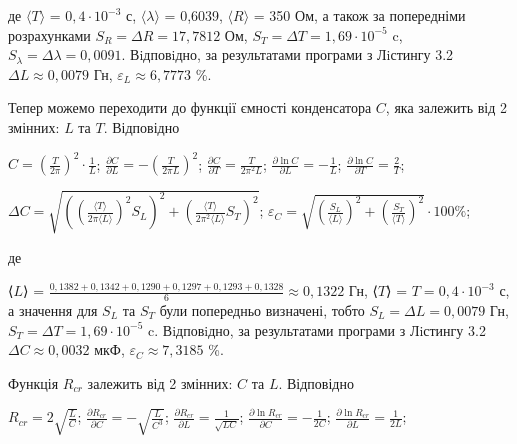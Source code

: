 \documentclass[12pt,a4paper]{article}
\begin{document}
    де $\text{⟨}T\text{⟩}$ = $0,4 \cdot 10^{-3}$ с, $\text{⟨}\lambda\text{⟩}$ = 0,6039, $\text{⟨}R\text{⟩}$ = 350 Ом, а також за попередніми розрахунками $S_R = \Delta R = 17,7812$ Ом, $S_T = \Delta T = 1,69 \cdot 10^{-5}$ c,
    $S_{\lambda} = \Delta \lambda = 0,0091$. Вiдповiдно, за результатами програми з Лiстингу 3.2 $\Delta L \approx 0,0079$ Гн, $\varepsilon_L \approx 6,7773$ \%.

    Тепер можемо переходити до функції ємності конденсатора $C$, яка залежить від 2 змінних: $L$ та $T$. Відповідно

    \begin{center}
        $\displaystyle C = \left( \frac{T}{2\pi} \right)^2 \cdot \frac{1}{L}$; $\displaystyle \frac{\partial C}{\partial L} = -\left( \frac{T}{2\pi L} \right)^2$; $\displaystyle \frac{\partial C}{\partial T} = \frac{T}{2\pi^2 L}$;
        $\displaystyle \frac{\partial \ln C}{\partial L} = -\frac{1}{L}$; $\displaystyle \frac{\partial \ln C}{\partial T} = \frac{2}{T}$;
    \end{center}

    \begin{center}
        $\displaystyle \Delta C = \sqrt{\left( \left( \frac{\text{⟨}T\text{⟩}}{2\pi\text{⟨}L\text{⟩}} \right)^2 S_{L} \right)^2 + \left( \frac{\text{⟨}T\text{⟩}}{2\pi^2\text{⟨}L\text{⟩}} S_T \right)^2}$;
        $\displaystyle \varepsilon_C = \sqrt{\left( \frac{S_{L}}{\text{⟨}L\text{⟩}} \right)^2 + \left( \frac{S_{T}}{\text{⟨}T\text{⟩}} \right)^2} \cdot 100 \%$;
    \end{center}

    де

    ⟨$L$⟩ = $\displaystyle \frac{0,1382 + 0,1342 + 0,1290 + 0,1297 + 0,1293 + 0,1328}{6} \approx 0,1322$ Гн, ⟨$T$⟩ = $T = 0,4 \cdot 10^{-3}$ с, а значення для $S_L$ та $S_T$ були попередньо визначені, тобто $S_{L} = \Delta L = 0,0079$ Гн,
    $S_T = \Delta T = 1,69 \cdot 10^{-5}$ c. Вiдповiдно, за результатами програми з Лiстингу 3.2 $\Delta C \approx 0,0032$ мкФ, $\varepsilon_C \approx 7,3185$ \%.

    Функція $R_{cr}$ залежить від 2 змінних: $C$ та $L$. Відповідно

    \begin{center}
        $\displaystyle R_{cr} = 2 \sqrt{\frac{L}{C}}$; $\displaystyle \frac{\partial R_{cr}}{\partial C} = -\sqrt{\frac{L}{C^3}}$; $\displaystyle \frac{\partial R_{cr}}{\partial L} = \frac{1}{\sqrt{LC}}$;
        $\displaystyle \frac{\partial \ln R_{cr}}{\partial C} = -\frac{1}{2C}$; $\displaystyle \frac{\partial \ln R_{cr}}{\partial L} = \frac{1}{2L}$;
    \end{center}
\end{document}
